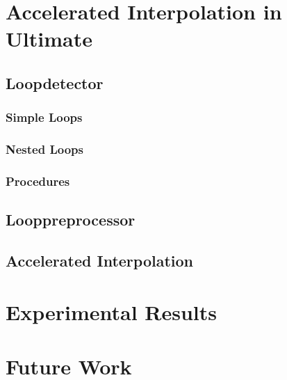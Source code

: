\documentclass{article}
\newcommand\mycom[1]{}
\newcommand\mycom[1]{#1}
\newcommand{\jw}[1]{\mycom{\todo[color=blue!40,inline]{\small JW: #1}}}
\begin{document}
\section{Accelerated Interpolation in Ultimate}
\subsection{Loopdetector}
\subsubsection{Simple Loops}

\subsubsection{Nested Loops}

\subsubsection{Procedures}

\subsection{Looppreprocessor}

\subsection{Accelerated Interpolation}


\section{Experimental Results}

\section{Future Work}
\jw{More Acceleration methods}

\pagebreak
{}



	
\end{document}
